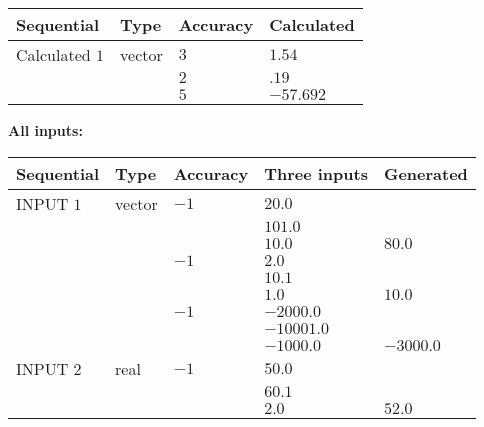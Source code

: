 \documentclass[12pt]{article}
\begin{document}
   
\noindent{}
   
   
  
  
\noindent\begin{tabular}{|l|l|l|l|}
\hline
 Sequential & Type & Accuracy & Calculated \\ 
\hline
 
 
  Calculated $           1$ & vector &  
  $           3 $ 
 &  $ 1.54 $ 
 \\    
  & & 
  $           2 $ 
 &  $ .19 $ 
 \\    
  & & 
  $           5 $ 
 &  $ -57.692 $ 
 \\  \hline  
 \end{tabular}
   
   
   
   
\noindent\vspace{0.1in}\hspace{-0.08in} {\textbf{\Large{All inputs: }}}
   
   
  
  
\noindent\begin{tabular}{|l|l|l|l|l|}
\hline
 Sequential & Type & Accuracy & Three inputs & Generated \\ 
\hline
 
 
  INPUT $           1$ & vector & $          -1 $ & $
20.0
  $ & \\
  & & & $
101.0
  $ & \\
  & & & $
10.0
$ & $ 80.0 $ 
  \\
  & & $          -1 $ & $
2.0
  $ & \\
  & & & $
10.1
  $ & \\
  & & & $
1.0
$ & $ 10.0 $ 
  \\
  & & $          -1 $ & $
-2000.0
  $ & \\
  & & & $
-10001.0
  $ & \\
  & & & $
-1000.0
$ & $ -3000.0 $ 
 \\  \hline  
 
 
  INPUT $           2$ & real & $          -1 $ & $
 50.0
  $ & \\
  & & &  $
 60.1
  $ & \\
  & & &  $
 2.0
 $ & $ 52.0 $ 
 \\  \hline  
 \end{tabular}
   
   
  
\vspace{0.2in}
  
\end{document}
